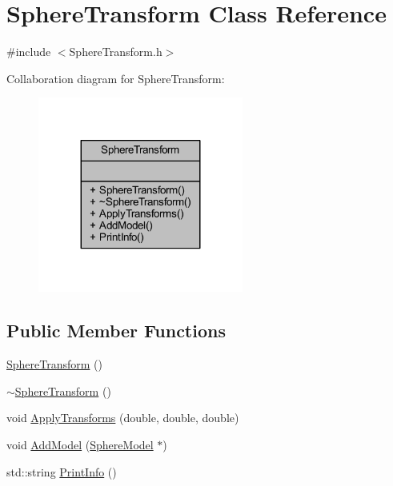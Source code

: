 \hypertarget{class_sphere_transform}{}\section{Sphere\+Transform Class Reference}
\label{class_sphere_transform}


{\ttfamily \#include $<$Sphere\+Transform.\+h$>$}



Collaboration diagram for Sphere\+Transform\+:\nopagebreak
\begin{figure}[H]
\begin{center}
\leavevmode
\includegraphics[width=191pt]{class_sphere_transform__coll__graph}
\end{center}
\end{figure}
\subsection*{Public Member Functions}
\begin{DoxyCompactItemize}
\item 
\mbox{\hyperlink{class_sphere_transform_a0e4a906dda31dc3bdf36098e147dca5a}{Sphere\+Transform}} ()
\item 
\mbox{\hyperlink{class_sphere_transform_a7edb4e09f5df299e73121b35647b665d}{$\sim$\+Sphere\+Transform}} ()
\item 
void \mbox{\hyperlink{class_sphere_transform_af8719b3fcc492e786ab399bd149bd402}{Apply\+Transforms}} (double, double, double)
\item 
void \mbox{\hyperlink{class_sphere_transform_a77f692a85c566d476a974951e961c22b}{Add\+Model}} (\mbox{\hyperlink{class_sphere_model}{Sphere\+Model}} $\ast$)
\item 
std\+::string \mbox{\hyperlink{class_sphere_transform_adbcb07243dd43a521a78fd6b23c9cea5}{Print\+Info}} ()
\end{DoxyCompactItemize}



